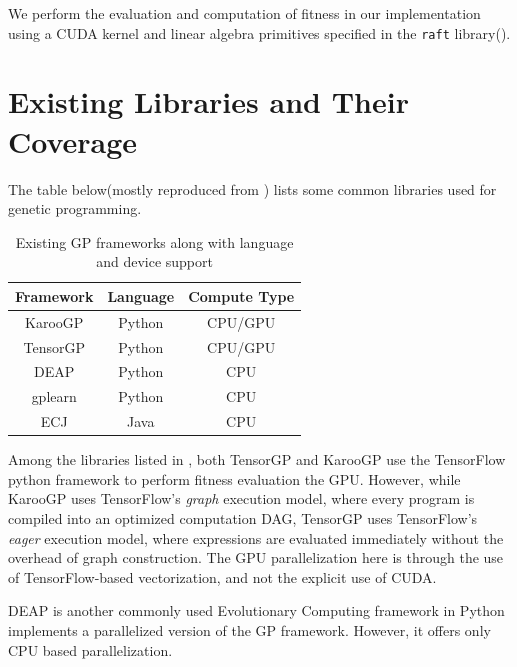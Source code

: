 We perform the evaluation and computation of fitness in our implementation using a CUDA kernel and linear algebra primitives specified in the \texttt{raft} library(\citep{raschka2020machine}).

\section{Existing Libraries and Their Coverage}
\label{sec:otherlibs}
The table below(mostly reproduced from \cite{baeta2021speed}) lists some common libraries  used for genetic programming.  

\begin{table}[htbp]
  \caption{Existing GP frameworks along with language and device support}
  \begin{center}
      \begin{tabular}[c]{ccc}
          \toprule
          \textbf{Framework} &   \textbf{Language} & \textbf{Compute Type} \\
          \midrule
          KarooGP & Python & CPU/GPU \\
          TensorGP & Python & CPU/GPU \\
          DEAP & Python & CPU \\
          gplearn  & Python & CPU \\
          ECJ & Java & CPU \\
          \bottomrule
      \end{tabular}
      \label{tab:otherlibs}
  \end{center}
\end{table}

Among the libraries listed in , both TensorGP\citep{baeta2021tensorgp} and KarooGP\citep{staats2017tensorflow} use the TensorFlow python framework to perform fitness evaluation the GPU. However, while KarooGP uses TensorFlow's \textit{graph} execution model, where every program is compiled into an optimized computation DAG, TensorGP uses TensorFlow's \textit{eager} execution model\citep{agrawal2019tensorflow}, where expressions are evaluated immediately without the overhead of graph construction. The GPU parallelization here is through the use of TensorFlow-based vectorization, and not the explicit use of CUDA. 

DEAP\citep{DEAP_JMLR2012} is another commonly used Evolutionary Computing framework in Python implements a parallelized version of the GP framework. However, it offers only CPU based parallelization. 

